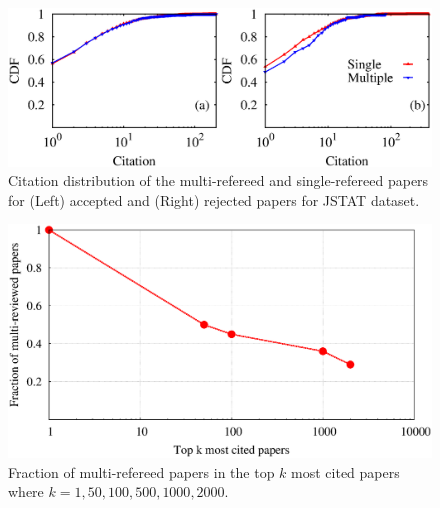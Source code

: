 \begin{figure}
 \centering
 \includegraphics[scale = 0.4]{./texfiles/Chapter_4/cikm_17/figures/citation_jstat_1.eps}
 \caption{\label{citation:jstat} Citation distribution of the multi-refereed and single-refereed papers for (Left) accepted and (Right) rejected papers for JSTAT dataset.}
\end{figure}

\begin{figure}
 \centering
 \includegraphics[scale = 0.28]{./texfiles/Chapter_4/cikm_17/figures/best_paper.eps}
 \caption{\label{fig:best} Fraction of multi-refereed papers in the top $k$ most cited papers where $k = 1,50,100,500,1000,2000$.}
\end{figure}


